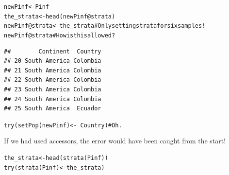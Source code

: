 \documentclass[letterpaper]{article}\usepackage[]{graphicx}\usepackage[]{color}
\makeatletter
\newcommand{\hlcom}[1]{\textcolor[rgb]{0.576,0.631,0.631}{#1}}%
\newcommand{\hlopt}[1]{\textcolor[rgb]{0.345,0.431,0.459}{#1}}%
\newcommand{\hlstd}[1]{\textcolor[rgb]{0.396,0.482,0.514}{#1}}%
\newcommand{\hlkwb}[1]{\textcolor[rgb]{0.522,0.6,0}{#1}}%
\newcommand{\hlkwc}[1]{\textcolor[rgb]{0.796,0.294,0.086}{#1}}%
\newcommand{\hlkwd}[1]{\textcolor[rgb]{0.345,0.431,0.459}{#1}}%
\newenvironment{kframe}{%
 \def\at@end@of@kframe{}%
 \ifinner\ifhmode%
  \def\at@end@of@kframe{\end{minipage}}%
  \begin{minipage}{\columnwidth}%
 \fi\fi%
 \def\FrameCommand##1{\hskip\@totalleftmargin \hskip-\fboxsep
 \colorbox{shadecolor}{##1}\hskip-\fboxsep
     \hskip-\linewidth \hskip-\@totalleftmargin \hskip\columnwidth}%
 \MakeFramed {\advance\hsize-\width
   \@totalleftmargin\z@ \linewidth\hsize
   \@setminipage}}%
 {\par\unskip\endMakeFramed%
 \at@end@of@kframe}
\newenvironment{knitrout}{}{} %
\makeatother
\begin{document}
\begin{knitrout}
\color{fgcolor}\begin{kframe}
\begin{alltt}
\hlstd{newPinf}        \hlkwb{<-} \hlstd{Pinf}
\hlstd{the_strata}     \hlkwb{<-} \hlkwd{head}\hlstd{(newPinf}\hlopt{@}\hlkwc{strata}\hlstd{)}
\hlstd{newPinf}\hlopt{@}\hlkwc{strata} \hlkwb{<-} \hlstd{the_strata}     \hlcom{# Only setting strata for six samples!}
\hlstd{newPinf}\hlopt{@}\hlkwc{strata}                   \hlcom{# How is this allowed?}
\end{alltt}
\begin{verbatim}
##        Continent  Country
## 20 South America Colombia
## 21 South America Colombia
## 22 South America Colombia
## 23 South America Colombia
## 24 South America Colombia
## 25 South America  Ecuador
\end{verbatim}
\begin{alltt}
\hlkwd{try}\hlstd{(}\hlkwd{setPop}\hlstd{(newPinf)} \hlkwb{<-} \hlopt{~}\hlstd{Country)} \hlcom{# Oh.}
\end{alltt}
\end{kframe}
\end{knitrout}
\begin{knitrout}
\color{fgcolor}\begin{kframe}


{\ttfamily\noindent\bfseries{}}\end{kframe}
\end{knitrout}


If we had used accessors, the error would have been caught from the start!

\begin{knitrout}
\color{fgcolor}\begin{kframe}
\begin{alltt}
\hlstd{the_strata}       \hlkwb{<-} \hlkwd{head}\hlstd{(}\hlkwd{strata}\hlstd{(Pinf))}
\hlkwd{try}\hlstd{(}\hlkwd{strata}\hlstd{(Pinf)} \hlkwb{<-} \hlstd{the_strata)}
\end{alltt}
\end{kframe}
\end{knitrout}
\begin{knitrout}
\color{fgcolor}\begin{kframe}


{\ttfamily\noindent\bfseries\color{errorcolor}{\#\# Error : Number of rows in data frame not equal to number of individuals in object.}}\end{kframe}
\end{knitrout}





\end{document}
